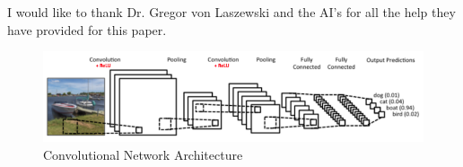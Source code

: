 \documentclass[sigconf]{acmart}
\begin{document}
\begin{acks}
I would like to thank Dr. Gregor von Laszewski and the AI's for all the help they have provided for this paper.

\end{acks}


 

\begin{figure}[htp]
    \includegraphics[width=1\textwidth]{images/image1.png}
    \caption{Convolutional Network Architecture \cite{google}}
    \label{fig:figure1}
\end{figure}
\end{document}

